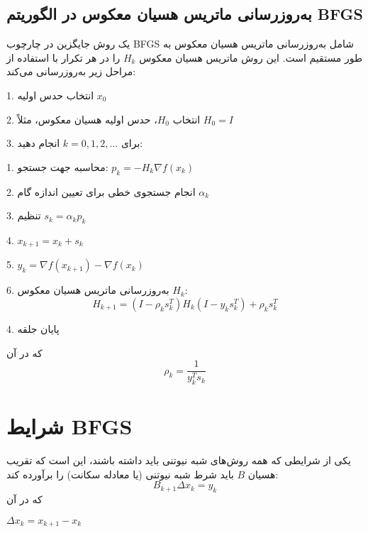 \documentclass{article}
\begin{document}
\subsection{به‌روزرسانی ماتریس هسیان معکوس در الگوریتم BFGS}

یک روش جایگزین در چارچوب BFGS شامل به‌روزرسانی ماتریس هسیان معکوس به طور مستقیم است. این روش ماتریس هسیان معکوس \( H_k \) را در هر تکرار با استفاده از مراحل زیر به‌روزرسانی می‌کند:

1. انتخاب حدس اولیه \( x_0 \)

2. انتخاب \( H_0 \)، حدس اولیه هسیان معکوس، مثلاً \( H_0 = I \)

3. برای \( k = 0, 1, 2, \ldots \) انجام دهید:

\hspace{0.5cm} 1. محاسبه جهت جستجو: \( p_k = -H_k \nabla f (x_k) \)

\hspace{0.5cm} 2. انجام جستجوی خطی برای تعیین اندازه گام \( \alpha_k \)

\hspace{0.5cm} 3. تنظیم \( s_k = \alpha_k p_k \)

\hspace{0.5cm} 4. \( x_{k+1} = x_k + s_k \)

\hspace{0.5cm} 5. \( y_k = \nabla f(x_{k+1}) - \nabla f(x_k) \)

\hspace{0.5cm} 6. به‌روزرسانی ماتریس هسیان معکوس \( H_k \):
\begin{equation}
H_{k+1} = (I - \rho_k s_k^T) H_k (I - y_k s_k^T) + \rho_k s_k^T
\end{equation}

4. پایان جلقه

که در آن
\begin{equation}
\rho_k = \frac{1}{y_k^T s_k}
\end{equation}

\section{شرایط BFGS}

یکی از شرایطی که همه روش‌های شبه نیوتنی باید داشته باشند، این است که تقریب هسیان \( B \) باید شرط شبه نیوتنی (یا معادله سکانت) را برآورده کند:
\begin{equation}
B_{k+1} \Delta x_k = y_k
\end{equation}
که در آن

\hspace{1.5cm}\( \Delta x_k = x_{k+1} - x_k \) 
\end{document}
